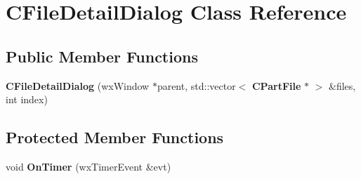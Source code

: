 \section{CFileDetailDialog Class Reference}
\label{classCFileDetailDialog}
\subsection*{Public Member Functions}
\begin{DoxyCompactItemize}
\item 
{\bfseries CFileDetailDialog} (wxWindow $\ast$parent, std::vector$<$ {\bf CPartFile} $\ast$ $>$ \&files, int index)\label{classCFileDetailDialog_a1c1e446d9a42810e972de3ef204655a7}

\end{DoxyCompactItemize}
\subsection*{Protected Member Functions}
\begin{DoxyCompactItemize}
\item 
void {\bfseries OnTimer} (wxTimerEvent \&evt)\label{classCFileDetailDialog_a52b31e2cbdbd5a42c3ed81e0412aaa46}

\end{DoxyCompactItemize}

